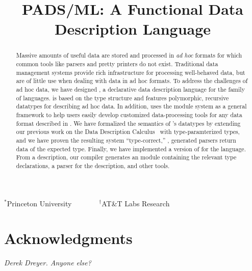\documentclass[nocopyrightspace]{sigplanconf}
\begin{document}
\title{PADS/ML: A Functional Data Description Language}
{$^\ast$Princeton University \ \ \ \ \ \ \ $^\dagger$AT\&T Labs Research}
 { \ \ \ \ }



\maketitle{}

\begin{abstract}  

  Massive amounts of useful data are stored and processed in
  \textit{ad hoc} formats for which common tools like parsers and
  pretty printers do not exist.  Traditional data management 
  systems provide rich infrastructure for processing well-behaved
  data, but are of little use when dealing with data in ad hoc
  formats.  To address the challenges of ad hoc data, we have designed
  \padsml{}, a declarative data description language for the \ml{} family
  of languages.  \padsml{} is based on the \ml{} type structure and
  features polymorphic, recursive datatypes for describing ad hoc
  data.  In addition, \padsml{} uses the \ml{} module system as a general
  framework to help users easily develop customized data-processing
  tools for any data format described in \padsml{}.  We have formalized the
  semantics of \padsml{}'s datatypes by extending our previous work on
  the Data Description Calculus~\cite{fisher+:next700ddl} with
  type-paramterized types, and we have proven the resulting system
  ``type-correct,'' \ie{}, generated parsers return data of the
  expected type.  Finally, we have implemented a version of \padsml{}
  for the \ocaml{} language.  From a \padsml{} description, our compiler
  generates an \ocaml{} module containing the relevant type
  declarations, a parser for the description, and other tools.

\end{abstract}















\section*{Acknowledgments}

\emph{Derek Dreyer. Anyone else?}



%


\end{document}
